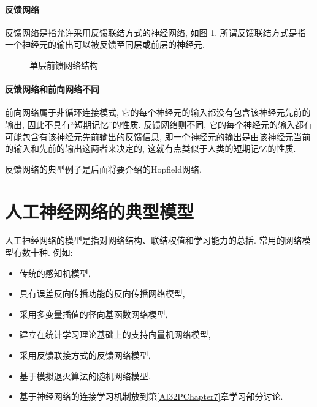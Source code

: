 \paragraph{反馈网络}
反馈网络是指允许采用反馈联结方式的神经网络, 如图 \ref{AI32fig1202205}. 所谓反馈联结方式是指一个神经元的输出可以被反馈至同层或前层的神经元.
\begin{figure}[H]
\begin{center}
\caption{单层前馈网络结构}
\label{AI32fig1202205}
\end{center}
\end{figure}
\paragraph{反馈网络和前向网络不同}
前向网络属于非循环连接模式, 它的每个神经元的输入都没有包含该神经元先前的输出, 因此不具有“短期记忆”的性质.
反馈网络则不同, 它的每个神经元的输入都有可能包含有该神经元先前输出的反馈信息, 即一个神经元的输出是由该神经元当前的输入和先前的输出这两者来决定的, 这就有点类似于人类的短期记忆的性质.
\begin{remark}
    反馈网络的典型例子是后面将要介绍的Hopfield网络.
\end{remark}
\section{人工神经网络的典型模型}
人工神经网络的模型是指对网络结构、联结权值和学习能力的总括. 常用的网络模型有数十种. 例如:
\begin{itemize}
\item 传统的感知机模型,
\item 具有误差反向传播功能的反向传播网络模型,
\item 采用多变量插值的径向基函数网络模型,
\item 建立在统计学习理论基础上的支持向量机网络模型,
\item 采用反馈联接方式的反馈网络模型,
\item 基于模拟退火算法的随机网络模型.
\item 基于神经网络的连接学习机制放到第\ref{AI32PChapter7}章学习部分讨论.
\end{itemize}
